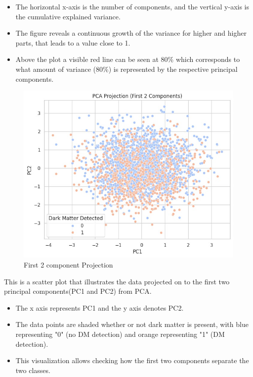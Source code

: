 \begin{itemize}
    \item The horizontal x-axis is the number of components, and the vertical y-axis is the cumulative explained variance.

    \item The figure reveals a continuous growth of the variance for higher and higher parts, that leads to a value close to 1.

    \item Above the plot a visible red line can be seen at 80\% which corresponds to what amount of variance (80\%) is represented by the respective principal components.
\end{itemize}
\begin{figure}[H]
    \centering
    \includegraphics[width=1\linewidth]{Chap3/pca_projection.jpeg}
    \caption{First 2 component Projection}
    \label{fig:placeholder}
\end{figure}

This is a scatter plot that illustrates the data projected on to the first two principal components(PC1 and PC2) from PCA.

\begin{itemize}
    \item The x axis represents PC1 and the y axis denotes PC2.

    \item The data points are shaded whether or not dark matter is present, with blue representing "0" (no DM detection) and orange representing "1" (DM detection).

    \item This visualization allows checking how the first two components separate the two classes.
\end{itemize}
 
